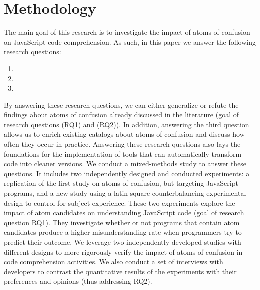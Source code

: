 \section{Methodology}
\label{method}

The main goal of this research is to investigate the impact of atoms of confusion on JavaScript code comprehension. As such, in this paper we answer the following research questions: 

\begin{enumerate}[(RQ1)]
\item \rqa 
\item \rqb
\item \rqd{}
\end{enumerate}


By answering these research questions, we can either generalize or refute the findings about atoms of confusion already discussed in the literature (goal of research questions (RQ1) and (RQ2)). In addition, answering the third question allows us to enrich existing catalogs about atoms of confusion and discuss how often they occur in practice. Answering these research questions also lays the foundations for the implementation of tools that can automatically transform code into cleaner versions.
We conduct a mixed-methods study to answer these questions. It includes two independently designed and conducted experiments: a replication of the first study on atoms of confusion, but targeting JavaScript programs, and a new study using a latin square counterbalancing experimental design to control for subject experience. 
These two experiments explore the impact of atom candidates on understanding JavaScript code (goal of research question RQ1). They investigate whether or not programs that contain atom candidates produce a higher misunderstanding rate when programmers try to predict their outcome.%
We leverage two independently-developed studies with different designs to more rigorously verify the impact of atoms of confusion in code comprehension activities. 
We also conduct a set of interviews with developers to contrast the quantitative results of the experiments with their preferences and opinions (thus addressing RQ2). 

